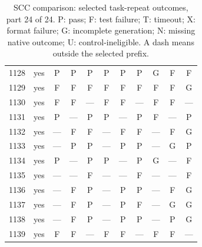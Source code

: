 \begin{table}[p]
\begin{tabular*}{\textwidth}{@{\extracolsep{\fill}}rc*{9}{c}@{}}
1128 & yes & P & P & P & P & P & P & G & F & F\\
1129 & yes & F & F & F & F & F & F & F & F & G\\
1130 & yes & F & F & — & F & F & — & F & F & —\\
1131 & yes & P & — & P & P & — & P & F & — & P\\
1132 & yes & — & F & F & — & F & F & — & F & G\\
1133 & yes & — & P & P & — & P & P & — & G & P\\
1134 & yes & P & — & P & P & — & P & G & — & F\\
1135 & yes & — & — & F & — & — & F & — & — & F\\
1136 & yes & — & F & P & — & P & P & — & F & G\\
1137 & yes & — & F & P & — & P & F & — & G & G\\
1138 & yes & — & F & P & — & P & P & — & P & G\\
1139 & yes & F & F & — & F & F & — & F & F & —\\
\bottomrule\end{tabular*}
\caption{SCC comparison: selected task-repeat outcomes, part 24 of 24. P: pass; F: test failure; T: timeout; X: format failure; G: incomplete generation; N: missing native outcome; U: control-ineligible. A dash means outside the selected prefix.}
\end{table}
\clearpage
